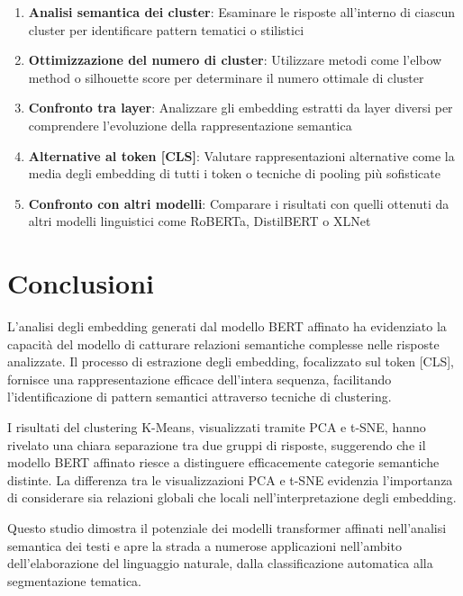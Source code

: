 \documentclass{article}
\begin{document}
\begin{enumerate}
    \item \textbf{Analisi semantica dei cluster}: Esaminare le risposte all'interno di ciascun cluster per identificare pattern tematici o stilistici
    \item \textbf{Ottimizzazione del numero di cluster}: Utilizzare metodi come l'elbow method o silhouette score per determinare il numero ottimale di cluster
    \item \textbf{Confronto tra layer}: Analizzare gli embedding estratti da layer diversi per comprendere l'evoluzione della rappresentazione semantica
    \item \textbf{Alternative al token [CLS]}: Valutare rappresentazioni alternative come la media degli embedding di tutti i token o tecniche di pooling più sofisticate
    \item \textbf{Confronto con altri modelli}: Comparare i risultati con quelli ottenuti da altri modelli linguistici come RoBERTa, DistilBERT o XLNet
\end{enumerate}

\section{Conclusioni}

L'analisi degli embedding generati dal modello BERT affinato ha evidenziato la capacità del modello di catturare relazioni semantiche complesse nelle risposte analizzate. Il processo di estrazione degli embedding, focalizzato sul token [CLS], fornisce una rappresentazione efficace dell'intera sequenza, facilitando l'identificazione di pattern semantici attraverso tecniche di clustering.

I risultati del clustering K-Means, visualizzati tramite PCA e t-SNE, hanno rivelato una chiara separazione tra due gruppi di risposte, suggerendo che il modello BERT affinato riesce a distinguere efficacemente categorie semantiche distinte. La differenza tra le visualizzazioni PCA e t-SNE evidenzia l'importanza di considerare sia relazioni globali che locali nell'interpretazione degli embedding.

Questo studio dimostra il potenziale dei modelli transformer affinati nell'analisi semantica dei testi e apre la strada a numerose applicazioni nell'ambito dell'elaborazione del linguaggio naturale, dalla classificazione automatica alla segmentazione tematica.
\end{document}

